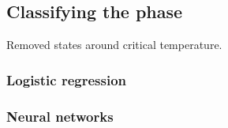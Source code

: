 \subsection{Classifying the phase}
Removed states around critical temperature.
\subsubsection{Logistic regression}
\subsubsection{Neural networks}






